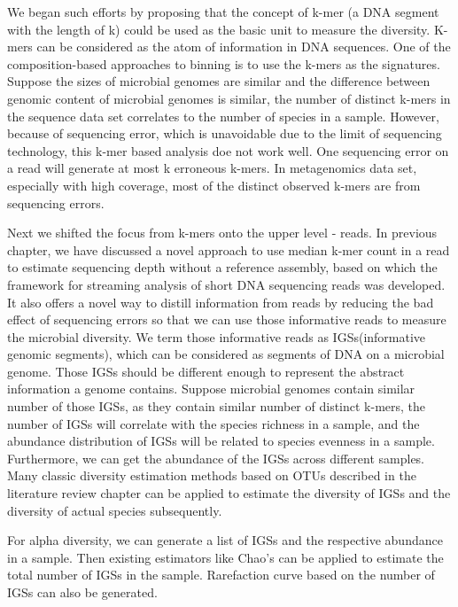 We began such efforts by proposing that
 the concept of k-mer (a DNA segment with the length of k) could be used as the 
 basic unit to measure
the diversity. K-mers can be considered as the atom of information in DNA 
sequences. One of the composition-based approaches to binning is to use the 
k-mers as the signatures.\cite{Alneberg2014} \cite{Imelfort2014} Suppose the sizes of microbial genomes are similar and
 the difference between genomic content of microbial genomes is similar, the 
number of distinct k-mers in the sequence data set correlates to the number of 
species in a sample. However, because of sequencing error, which is unavoidable
 due to the limit of sequencing technology, this k-mer based analysis doe not 
work well. One sequencing error on a read will generate at most k erroneous 
k-mers. In metagenomics data set, especially with high coverage, most of the 
distinct observed k-mers are from sequencing errors.

Next we shifted the focus from k-mers onto the upper level - reads. 
In previous chapter, we have discussed a novel approach to use median k-mer 
count in a read to estimate
sequencing depth without a reference assembly, based on which the framework for
streaming analysis of short DNA sequencing reads was developed.
It also offers a novel way to distill information from reads by reducing the
 bad effect of sequencing errors so that we can use those informative reads to 
measure the microbial diversity. We term those informative reads as 
IGSs(informative genomic segments), which can be considered as segments of DNA 
on a microbial genome. Those IGSs should be different enough to represent the 
abstract information a genome contains. Suppose microbial genomes contain 
similar number of those IGSs, as they contain similar number of distinct 
k-mers, the number of IGSs will correlate with the species richness in a 
sample, and the abundance distribution of IGSs will be related to species 
evenness in a sample. Furthermore, we can get the abundance of the IGSs across
different samples. Many classic diversity estimation methods based on OTUs 
 described in the literature review chapter can be applied to estimate 
 the diversity of IGSs 
and the diversity of actual species subsequently.


For alpha diversity, we can generate a list of IGSs and the respective 
abundance in a sample. Then existing estimators like Chao's can be applied to 
estimate the total number of IGSs in the sample. Rarefaction curve based on the
number of IGSs can also be generated. 

